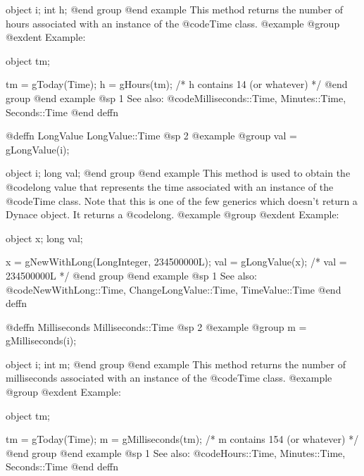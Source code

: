 object  i;
int     h;
@end group
@end example
This method returns the number of hours associated with an
instance of the @code{Time} class.
@example
@group
@exdent Example:

object  tm;

tm = gToday(Time);
h = gHours(tm);   /*  h contains 14 (or whatever)  */
@end group
@end example
@sp 1
See also:  @code{Milliseconds::Time, Minutes::Time, Seconds::Time}
@end deffn
















@deffn {LongValue} LongValue::Time
@sp 2
@example
@group
val = gLongValue(i);

object  i;
long    val;
@end group
@end example
This method is used to obtain the @code{long} value that represents
the time associated with an instance of the @code{Time} class.  Note that
this is one of the few generics which doesn't return a Dynace object.
It returns a @code{long}.
@example
@group
@exdent Example:

object  x;
long    val;

x = gNewWithLong(LongInteger, 234500000L);
val = gLongValue(x);    /*  val = 234500000L  */
@end group
@end example
@sp 1
See also:  @code{NewWithLong::Time, ChangeLongValue::Time, TimeValue::Time}
@end deffn










@deffn {Milliseconds} Milliseconds::Time
@sp 2
@example
@group
m = gMilliseconds(i);

object  i;
int     m;
@end group
@end example
This method returns the number of milliseconds associated with an
instance of the @code{Time} class.
@example
@group
@exdent Example:

object  tm;

tm = gToday(Time);
m = gMilliseconds(tm);   /*  m contains 154 (or whatever)  */
@end group
@end example
@sp 1
See also:  @code{Hours::Time, Minutes::Time, Seconds::Time}
@end deffn

















